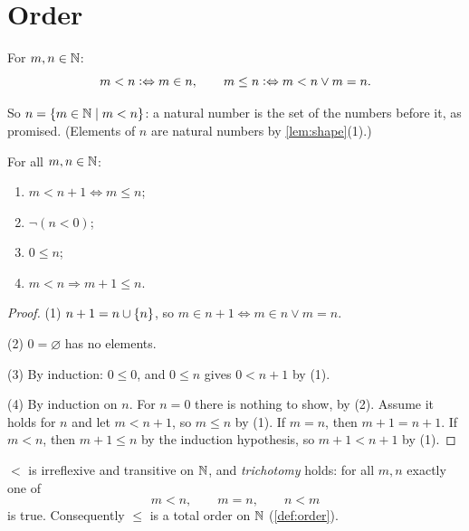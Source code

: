 \section{Order}

\begin{definition}[Order on $\N$]
\label{def:order-naturals}
For $m, n \in \mathbb{N}$:
\[
  m < n \mathrel{\vcentcolon\Leftrightarrow} m \in n, \qquad m \le n \mathrel{\vcentcolon\Leftrightarrow} m < n \lor m = n.
\]
\end{definition}

So $n = \lbrace m \in \mathbb{N} \mid m < n \rbrace$: a natural number is the set of the numbers
before it, as promised. (Elements of $n$ are natural numbers by
\cref{lem:shape}(1).)

\begin{lemma}
\label{lem:order-naturals}
For all $m, n \in \mathbb{N}$:
\begin{enumerate}
  \item $m < n + 1 \Leftrightarrow m \le n$;
  \item $\lnot (n < 0)$;
  \item $0 \le n$;
  \item $m < n \Rightarrow m + 1 \le n$.
\end{enumerate}
\end{lemma}

\begin{proof}
(1) $n + 1 = n \cup \lbrace n \rbrace$, so $m \in n + 1 \Leftrightarrow m \in n \lor m = n$.

(2) $0 = \varnothing$ has no elements.

(3) By induction: $0 \le 0$, and $0 \le n$ gives $0 < n + 1$ by (1).

(4) By induction on $n$. For $n = 0$ there is nothing to show, by (2). Assume it
holds for $n$ and let $m < n + 1$, so $m \le n$ by (1). If $m = n$, then $m + 1 = n
+ 1$. If $m < n$, then $m + 1 \le n$ by the induction hypothesis, so $m + 1 < n +
1$ by (1).
\end{proof}

\begin{theorem}
\label{thm:total-order-naturals}
$<$ is irreflexive and transitive on $\N$, and \emph{trichotomy} holds: for all
$m, n$ exactly one of
\[
  m < n, \qquad m = n, \qquad n < m
\]
is true. Consequently $\le$ is a total order on $\N$ (\cref{def:order}).
\end{theorem}


